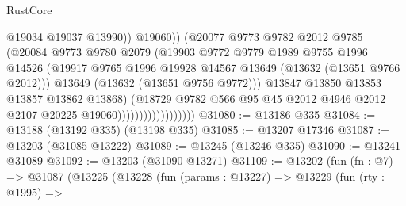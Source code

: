 \begin{lexlean}{RustCore}
\begin{coremodule}
                                            @19034
                                            @19037
                                            @13990))
                                        @19060))
                                    (@20077
                                      @9773
                                      @9782
                                      @2012
                                      @9785
                                      (@20084
                                        @9773
                                        @9780
                                        @2079
                                        (@19903
                                          @9772
                                          @9779
                                          @1989
                                          @9755
                                          @1996
                                          @14526
                                          (@19917
                                            @9765
                                            @1996
                                            @19928
                                            @14567
                                            @13649
                                            (@13632 (@13651 @9766 @2012)))
                                          @13649
                                          (@13632 (@13651 @9756 @9772)))
                                        @13847
                                        @13850
                                        @13853
                                        @13857
                                        @13862
                                        @13868)
                                      (@18729
                                        @9782
                                        @566
                                        @95
                                        @45
                                        @2012
                                        @4946
                                        @2012
                                        @2107
                                        @20225
                                        @19060))))))))))))))))))
@31080 := @13186 @335
@31084 := @13188 (@13192 @335) (@13198 @335)
@31085 := @13207 @17346
@31087 := @13203 (@31085 @13222)
@31089 := @13245 (@13246 @335)
@31090 := @13241 @31089
@31092 := @13203 (@31090 @13271)
@31109 := @13202
    (fun (fn : @7) =>
    @31087
      (@13225
        (@13228
          (fun (params : @13227) =>
          @13229
            (fun (rty : @1995) =>

\end{coremodule}
\end{lexlean}
